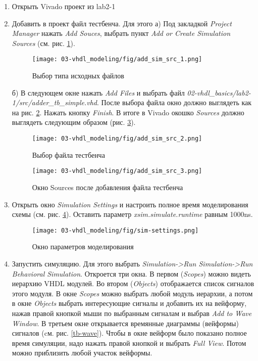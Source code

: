 \begin{enumerate}
\item Открыть Vivado проект из lab2-1
\item Добавить в проект файл тестбенча. Для этого
а) Под закладкой \emph{Project Manager} нажать \emph{Add Souces}, выбрать пункт \emph{Add or Create Simulation Sources} (см. рис. \ref{add_sim_src_1}).

\begin{figure}
\centering
\texttt{[image: 03-vhdl\_modeling/fig/add\_sim\_src\_1.png]}
\caption{Выбор типа исходных файлов}
\label{add_sim_src_1}
\end{figure}

б) В следующем окне нажать \emph{Add Files} и выбрать файл \emph{02-vhdl\_basics/lab2-1/src/adder\_tb\_simple.vhd}. После выбора файла окно должно выглядеть как на рис. \ref{add_sim_src_2}. Нажать кнопку \emph{Finish}. В итоге в Vivado окошко \emph{Sources} должно выглядеть следующим образом (рис. \ref{add_sim_src_3}).

\begin{figure}
\centering
\texttt{[image: 03-vhdl\_modeling/fig/add\_sim\_src\_2.png]}
\caption{Выбор файла тестбенча}
\label{add_sim_src_2}
\end{figure}

\begin{figure}
\centering
\texttt{[image: 03-vhdl\_modeling/fig/add\_sim\_src\_3.png]}
\caption{Окно Sources после добавления файла тестбенча}
\label{add_sim_src_3}
\end{figure}


\item Открыть окно \emph{Simulation Settings} и настроить полное время моделирования схемы (см. рис. \ref{sim-setting}). Оставить параметр \emph{xsim.simulate.runtime} равным 1000ns.

\begin{figure}
\centering
\texttt{[image: 03-vhdl\_modeling/fig/sim-settings.png]}
\caption{Окно параметров моделирования}
\label{sim-setting}
\end{figure}


\item Запустить симуляцию. Для этого выбрать \emph{Simulation->Run Simulation->Run  Behavioral Simulation}. Откроется три окна. В первом (\emph{Scopes}) можно видеть иерархию VHDL модулей. Во втором (\emph{Objects}) отображается список сигналов этого модуля. В окне \emph{Scopes} можно выбрать любой модуль иерархии, а потом в окне \emph{Objects} выбрать интересующие сигналы и добавить их на вейформу, нажав правой кнопкой мыши по выбранным сигналам и выбрав \emph{Add to Wave Window}. В третьем окне открывается времянные диаграммы (вейформы) сигналов (cм. рис. \ref{tb-wave}). Чтобы в окне вейформ было показано полное время симуляции, надо нажать правой кнопкой и выбрать \emph{Full View}. Потом можно приблизить любой участок вейформы.


\end{enumerate}
